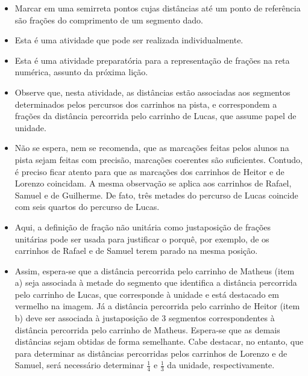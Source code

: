 \begin{multicols}{2}
\begin{objetivos}[label=chap2-ativ12]{}{}
\begin{itemize} %
    \item       Marcar em uma semirreta pontos cujas distâncias até um ponto de referência são frações do comprimento de um segmento dado.
\end{itemize} %
\end{objetivos}

\begin{orientacoes}
  \begin{itemize} %
    \item       Esta é uma atividade que pode ser realizada individualmente.
    \item       Esta é uma atividade preparatória para a representação de frações na reta numérica, assunto da próxima lição.
    \item       Observe que, nesta atividade, as distâncias estão associadas aos segmentos determinados pelos percursos dos carrinhos na pista, e correspondem a frações da distância percorrida pelo carrinho de Lucas, que assume papel de unidade.
    \item       Não se espera, nem se recomenda, que as marcações feitas pelos alunos na pista sejam feitas com precisão, marcações coerentes são suficientes. Contudo, é preciso ficar atento para que as marcações dos carrinhos de Heitor e de Lorenzo coincidam. A mesma observação se aplica aos carrinhos de Rafael, Samuel e de Guilherme. De fato, três metades do percurso de Lucas coincide com seis quartos do percurso de Lucas.
    \item       Aqui, a definição de fração não unitária como justaposição de frações unitárias pode ser usada para justificar o porquê, por exemplo, de os carrinhos de Rafael e de Samuel terem parado na mesma posição.
    \item       Assim, espera-se que a distância percorrida pelo carrinho de Matheus (item a) seja associada à metade do segmento que identifica a distância percorrida pelo carrinho de Lucas, que corresponde à unidade e está destacado em vermelho na imagem. Já a distância percorrida pelo carrinho de Heitor (item b) deve ser associada à justaposição de       $3$ segmentos correspondentes à distância percorrida pelo carrinho de Matheus. Espera-se que as demais distâncias sejam obtidas de forma semelhante. Cabe destacar, no entanto, que para determinar as distâncias percorridas pelos carrinhos de Lorenzo e de Samuel, será necessário determinar       $\frac{1}{4}$ e       $\frac{1}{3}$ da unidade, respectivamente.

\end{itemize}
\end{orientacoes}
\end{multicols}
